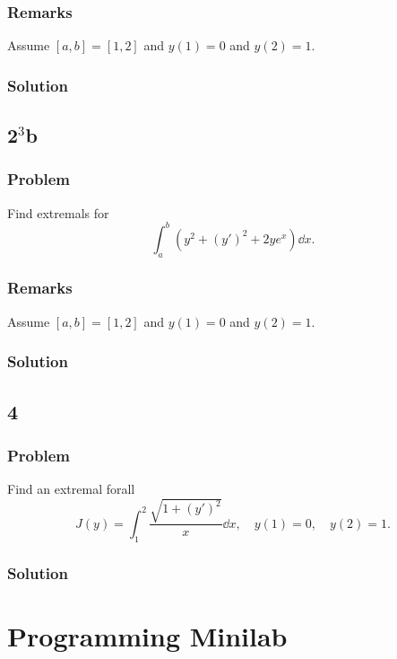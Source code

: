 \documentclass[12pt,twoside]{article}
\begin{document}
\subsubsection*{Remarks}
Assume $[a,b]=[1,2]$ and $y(1)=0$ and $y(2)=1$.

\subsubsection*{Solution}
\todo{}

\subsection{2$^3$b}
\subsubsection*{Problem}
Find extremals for
\begin{equation}
  \label{eq:4.3.2b-problem}
  \int_a^b(y^2+{(y')}^2 + 2ye^x)\dd{x}.
\end{equation}

\subsubsection*{Remarks}
Assume $[a,b]=[1,2]$ and $y(1)=0$ and $y(2)=1$.
\subsubsection*{Solution}
\todo{}

\subsection{4}
\subsubsection*{Problem}
Find an extremal forall
\begin{equation}
  \label{eq:4.3.4-problem}
  J(y) = \int_1^2\frac{\sqrt{1+{(y')}^2}}{x}\dd{x},\quad y(1)=0,\quad y(2)=1.
\end{equation}
\subsubsection*{Solution}
\todo{}

\section{Programming Minilab}
\end{document}
